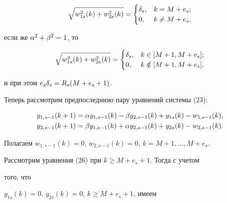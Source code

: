 \begin{equation}


\sqrt{w_{1s}^2(k)+ w_{2s}^2(k)} =


\begin{cases}


\d_s, & k = M+e_s;\\


0, & k \neq M+e_s,


\end{cases}


\end{equation}


если же $\alpha^2 + \beta^2 = 1$, то


\begin{equation}


\sqrt{w_{1s}^2(k)+ w_{2s}^2(k)} =


\begin{cases}


\d_s,&k \in [M+1, M+e_s];\\


0,& k \notin [M +1, M + e_s],


\end{cases}


\end{equation}


и при этом $e_s\delta_s = R_s(M+e_s+1)$.


Теперь рассмотрим предпоследнюю пару уравнений системы (23):


\begin{equation}


\begin{split}


y_{1,s-1}(k+1) &= \a y_{1,s-1}(k)-\b y_{2,s-1}(k) + y_{1s}(k)-


w_{1,s-1}(k),\\


y_{2,s-1}(k+1) &= \b y_{1,s-1}(k)+ \a y_{2,s-1}(k) + y_{2s}(k)-


w_{2,s-1}(k).


\end{split}


\end{equation}


Полагаем $w_{1,s-1}(k) = 0$, $w_{2,s-1}(k) = 0$, $k = M+1,


\dotsc, M+e_s$.


Рассмотрим уравнения (26) при $k \geq M+e_s+1$. Тогда с учетом


того, что


$y_{1s}(k) = 0$, $y_{2s}(k) = 0$, $k \geq M+e_s+1$, имеем


